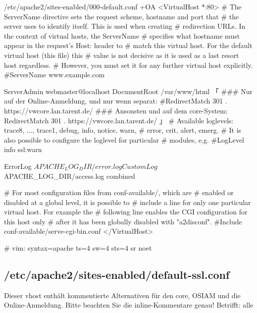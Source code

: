 \begin{lstdump}[tabsize=2]{/etc/apache2/sites-enabled/000-default.conf +OA}
<VirtualHost *:80>
	# The ServerName directive sets the request scheme, hostname and port that
	# the server uses to identify itself. This is used when creating
	# redirection URLs. In the context of virtual hosts, the ServerName
	# specifies what hostname must appear in the request's Host: header to
	# match this virtual host. For the default virtual host (this file) this
	# value is not decisive as it is used as a last resort host regardless.
	# However, you must set it for any further virtual host explicitly.
	#ServerName www.example.com

	ServerAdmin webmaster@localhost
	DocumentRoot /var/www/html
「
	### Nur auf der Online-Anmeldung, und nur wenn separat:
	#RedirectMatch 301 . https://vwcore.lan.tarent.de/
	### Ansonsten und auf dem core-System:
	RedirectMatch 301 . https://vwcore.lan.tarent.de/
」
	# Available loglevels: trace8, ..., trace1, debug, info, notice, warn,
	# error, crit, alert, emerg.
	# It is also possible to configure the loglevel for particular
	# modules, e.g.
	#LogLevel info ssl:warn

	ErrorLog ${APACHE_LOG_DIR}/error.log
	CustomLog ${APACHE_LOG_DIR}/access.log combined

	# For most configuration files from conf-available/, which are
	# enabled or disabled at a global level, it is possible to
	# include a line for only one particular virtual host. For example the
	# following line enables the CGI configuration for this host only
	# after it has been globally disabled with "a2disconf".
	#Include conf-available/serve-cgi-bin.conf
</VirtualHost>

# vim: syntax=apache ts=4 sw=4 sts=4 sr noet
\end{lstdump}

\subsection{/etc/apache2/sites-enabled/default-ssl.conf}\label{subsec:refcfg-apache-defssl}

Dieser vhost enthält kommentierte Alternativen für den core,
OSIAM und die Online-Anmeldung. Bitte beachten Sie die
inline-Kommentare genau! Betrifft: alle


